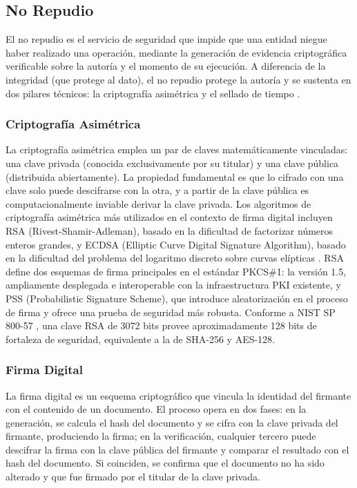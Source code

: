 \subsection{No Repudio}\label{sec:no-repudio}

El no repudio es el servicio de seguridad que impide que una entidad niegue haber realizado una operación, mediante la generación de evidencia criptográfica verificable sobre la autoría y el momento de su ejecución. A diferencia de la integridad (que protege al dato), el no repudio protege la autoría y se sustenta en dos pilares técnicos: la criptografía asimétrica y el sellado de tiempo \cite{stallings2017}.

\subsubsection{Criptografía Asimétrica}

La criptografía asimétrica emplea un par de claves matemáticamente vinculadas: una clave privada (conocida exclusivamente por su titular) y una clave pública (distribuida abiertamente). La propiedad fundamental es que lo cifrado con una clave solo puede descifrarse con la otra, y a partir de la clave pública es computacionalmente inviable derivar la clave privada. Los algoritmos de criptografía asimétrica más utilizados en el contexto de firma digital incluyen RSA (Rivest-Shamir-Adleman), basado en la dificultad de factorizar números enteros grandes, y ECDSA (Elliptic Curve Digital Signature Algorithm), basado en la dificultad del problema del logaritmo discreto sobre curvas elípticas \cite{menezes1996,nist2023fips186}. RSA define dos esquemas de firma principales en el estándar PKCS\#1: la versión 1.5, ampliamente desplegada e interoperable con la infraestructura PKI existente, y PSS (Probabilistic Signature Scheme), que introduce aleatorización en el proceso de firma y ofrece una prueba de seguridad más robusta. Conforme a NIST SP 800-57 \cite{barker2020}, una clave RSA de 3072 bits provee aproximadamente 128 bits de fortaleza de seguridad, equivalente a la de SHA-256 y AES-128.

\subsubsection{Firma Digital}

La firma digital es un esquema criptográfico que vincula la identidad del firmante con el contenido de un documento. El proceso opera en dos fases: en la generación, se calcula el hash del documento y se cifra con la clave privada del firmante, produciendo la firma; en la verificación, cualquier tercero puede descifrar la firma con la clave pública del firmante y comparar el resultado con el hash del documento. Si coinciden, se confirma que el documento no ha sido alterado y que fue firmado por el titular de la clave privada.

